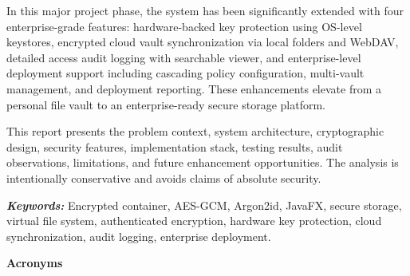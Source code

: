 In this major project phase, the system has been significantly extended with four enterprise-grade features: hardware-backed key protection using OS-level keystores, encrypted cloud vault synchronization via local folders and WebDAV, detailed access audit logging with searchable viewer, and enterprise-level deployment support including cascading policy configuration, multi-vault management, and deployment reporting. These enhancements elevate \projname{} from a personal file vault to an enterprise-ready secure storage platform.

This report presents the problem context, system architecture, cryptographic design, security features, implementation stack, testing results, audit observations, limitations, and future enhancement opportunities. The analysis is intentionally conservative and avoids claims of absolute security.

\textit{\textbf{Keywords:}} Encrypted container, AES-GCM, Argon2id, JavaFX, secure storage, virtual file system, authenticated encryption, hardware key protection, cloud synchronization, audit logging, enterprise deployment.

  
\clearpage
\thispagestyle{empty}
\sitheader

\vspace*{0.5cm}
\begin{center}
	\textbf{\Large Acronyms}
\end{center}

\clearpage
\thispagestyle{empty}
\sitheader

